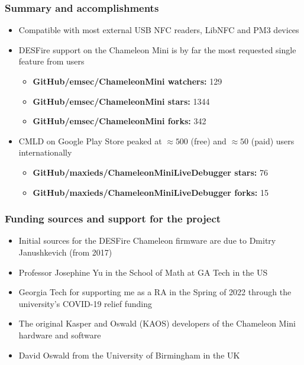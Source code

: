 \documentclass[usenames,svgnames,dvipsnames,11pt]{beamer}
\begin{document}
\begin{frame}
\frametitle{Summary and accomplishments}

\begin{itemize} 

\item Compatible with most external 
      USB NFC readers, LibNFC and PM3 devices
\item DESFire support on the Chameleon Mini is by far the 
      most requested single feature from users \\ 
      \begin{itemize}
      \item \textbf{GitHub/emsec/ChameleonMini watchers:} 129
      \item \textbf{GitHub/emsec/ChameleonMini stars:} 1344
      \item \textbf{GitHub/emsec/ChameleonMini forks:} 342
      \end{itemize}
\item CMLD on Google Play Store peaked at 
      $\approx 500$ (free) and $\approx 50$ (paid) users internationally 
      \begin{itemize}
      \item \textbf{GitHub/maxieds/ChameleonMiniLiveDebugger stars:} 76
      \item \textbf{GitHub/maxieds/ChameleonMiniLiveDebugger forks:} 15
      \end{itemize}

\end{itemize} 

\end{frame}

\begin{frame}
\frametitle{Funding sources and support for the project}

\begin{itemize} 

\item Initial sources for the DESFire Chameleon firmware are due to 
      Dmitry Janushkevich (from 2017)
\item Professor Josephine Yu in the School of Math at GA Tech in the US
\item Georgia Tech for supporting me as a RA in the Spring of 2022 through the university's 
      COVID-19 relief funding 
\item The original Kasper and Oswald (KAOS) developers of the Chameleon Mini hardware and software 
\item David Oswald from the University of Birmingham in the UK

\end{itemize} 

\end{frame}
\end{document}
